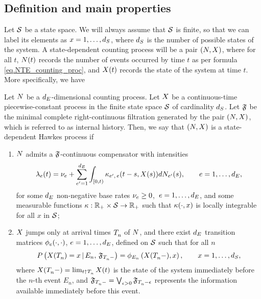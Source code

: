 \documentclass[10pt, article,table]{article}
\begin{document}
\subsection{Definition and main properties}\label{sec.sdHawkes_def_and_props}
Let $\stateSpace$ be a state space. We will always assume that $\stateSpace$ is finite, so that we can label its elements as $x=1, \dots, \numStates$, where $\numStates$ is the number of possible states of the system. A state-dependent counting process will be a pair $(\multiCountingProc, \stateVariable)$, where for all $t$, $\multiCountingProc(t)$ records the number of events occurred by time $t$ as per formula \eqref{eq.NTE_counting_proc}, and $\stateVariable(t)$ records the state of the system at time $t$. More specifically, we have
\begin{defi}\label{def.sdHawkes}
 Let $\multiCountingProc$ be a $\numEventTypes$-dimensional counting process. Let $\stateVariable$ be a continuous-time piecewise-constant process in the finite state space $\stateSpace$ of cardinality $\numStates$. Let $\internalHistory$ be the minimal complete right-continuous filtration generated by the pair $(\multiCountingProc, \stateVariable)$, which is referred to as internal history. Then, we say that $(\multiCountingProc, \stateVariable)$ is a state-dependent Hawkes process if 
 \begin{enumerate}
  \item $\multiCountingProc$ admits a $\internalHistory$-continuous compensator with intensities
  \begin{equation}\label{eq.intensity_of_sdHawkes}
   \intensity(t) = \baseRate_e + \sum_{\eone=1}^{\numEventTypes}\int_{[0,t)} \hawkesKernel\subscriptee(t-s, \stateVariable(s))d\countingProc[\eone](s), \qquad e=1,\dots,\numEventTypes,
  \end{equation}
  for some $\numEventTypes$ non-negative base rates $\baseRate_e\geq 0$, $\, e=1, \dots, \numEventTypes$, and some measurable functions $\hawkesKernel: \R_+ \times \stateSpace \rightarrow \R_+$ such that $\hawkesKernel(\cdot, x)$ is locally integrable for all $x$ in $\stateSpace$;
  \item $\stateVariable$ jumps only at arrival times $\arrivalTimes[ ]_{n}$ of $\multiCountingProc$, and there exist $\numEventTypes$ transition matrices $\transProb_e(\cdot,\cdot)$, $e=1,\dots, \numEventTypes$, defined on $\stateSpace$ such that for all $n$
  \begin{equation}\label{eq.markov_update_stateVariable}
   \Prob\left( \stateVariable(\arrivalTimes[ ]_{n})=x \,  \vert \,  E_n, \, \internalHistory_{\arrivalTimes[ ]_{n}-} \right)
   =
   \transProb_{E_n}\left(\stateVariable(\arrivalTimes[ ]_{n}-),x\right),
   \qquad
   x=1, \dots, \numStates,
  \end{equation}
  where $\stateVariable(\arrivalTimes[ ]_{n}- ) = \lim_{t\uparrow \arrivalTimes[ ]_{n}} \stateVariable(t)$ is the state of the system immediately before the $n$-th event $E_n$, and $\internalHistory_{\arrivalTimes[ ]_{n}-} = \bigvee_{\epsilon>0} \internalHistory_{\arrivalTimes[ ]_{n} - \epsilon}$ represents the information available immediately before this event.
 \end{enumerate}
\end{defi}
\end{document}
